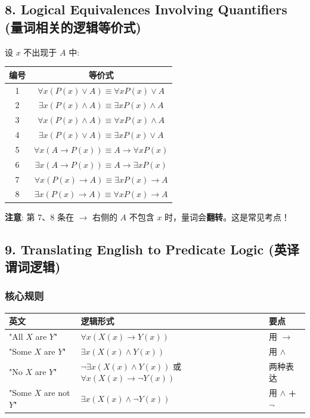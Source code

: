 \documentclass[10pt,a4paper,openany]{ctexbook}
\theoremstyle{definition}
\theoremstyle{remark}
\renewenvironment{quote}
  {\list{}{\leftmargin=1em\rightmargin=0pt\topsep=0.5pt\partopsep=0pt}\item[]}
  {\endlist}
\begin{document}
\subsection{8. Logical Equivalences Involving Quantifiers (量词相关的逻辑等价式)}

设 $x$ 不出现于 $A$ 中:
\begin{center}
\begin{tabular}{cc}
\hline
编号 & 等价式 \\ \hline
1 & $\forall x (P(x) \lor A) \equiv \forall x P(x) \lor A$ \\
2 & $\exists x (P(x) \land A) \equiv \exists x P(x) \land A$ \\
3 & $\forall x (P(x) \land A) \equiv \forall x P(x) \land A$ \\
4 & $\exists x (P(x) \lor A) \equiv \exists x P(x) \lor A$ \\
5 & $\forall x (A \to P(x)) \equiv A \to \forall x P(x)$ \\
6 & $\exists x (A \to P(x)) \equiv A \to \exists x P(x)$ \\
7 & $\forall x (P(x) \to A) \equiv \exists x P(x) \to A$ \\
8 & $\exists x (P(x) \to A) \equiv \forall x P(x) \to A$ \\
\hline
\end{tabular}

\end{center}

\begin{quote}
\textbf{注意}: 第 7、8 条在 $\to$ 右侧的 $A$ 不包含 $x$ 时，量词会\textbf{翻转}。这是常见考点！

\end{quote}
\vspace{-2pt}

\subsection{9. Translating English to Predicate Logic (英译谓词逻辑)}

\subsubsection{核心规则}

\begin{center}
\begin{tabular}{lll}
\hline
英文 & 逻辑形式 & 要点 \\ \hline
"All $X$ are $Y$" & $\forall x (X(x) \to Y(x))$ & 用 \textbf{$\to$} \\
"Some $X$ are $Y$" & $\exists x (X(x) \land Y(x))$ & 用 \textbf{$\land$} \\
"No $X$ are $Y$" & $\neg \exists x (X(x) \land Y(x))$ 或 $\forall x (X(x) \to \neg Y(x))$ & 两种表达 \\
"Some $X$ are not $Y$" & $\exists x (X(x) \land \neg Y(x))$ & 用 \textbf{$\land$ + $\neg$} \\
\hline
\end{tabular}

\end{center}
\end{document}
